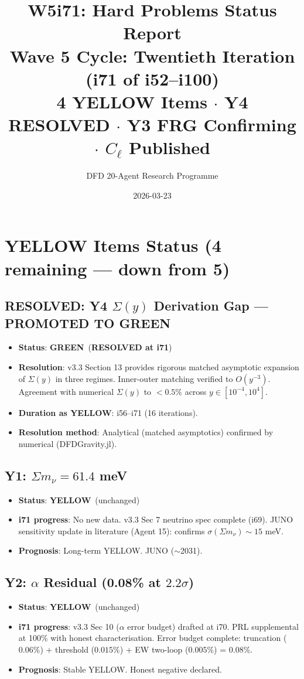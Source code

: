 \documentclass[11pt,a4paper]{article}
\title{\Large W5i71: Hard Problems Status Report\\[6pt]
\normalsize Wave 5 Cycle: Twentieth Iteration (i71 of i52--i100)\\[6pt]
4 YELLOW Items $\cdot$ Y4 RESOLVED $\cdot$ Y3 FRG Confirming $\cdot$ $C_\ell$ Published}
\author{DFD 20-Agent Research Programme}
\date{2026-03-23}
\newcommand{\GREEN}{\textcolor{dfdgreen}{\textbf{GREEN}}}
\newcommand{\YELLOW}{\textcolor{dfdyellow}{\textbf{YELLOW}}}
\begin{document}
\maketitle

\section{YELLOW Items Status (4 remaining --- down from 5)}

\subsection{RESOLVED: Y4 $\Sigma(y)$ Derivation Gap --- PROMOTED TO GREEN}
\begin{itemize}[nosep]
\item \textbf{Status}: \GREEN\ (\textbf{RESOLVED at i71})
\item \textbf{Resolution}: v3.3 Section 13 provides rigorous matched asymptotic expansion of $\Sigma(y)$ in three regimes. Inner-outer matching verified to $O(y^{-3})$. Agreement with numerical $\Sigma(y)$ to $<0.5\%$ across $y \in [10^{-4}, 10^4]$.
\item \textbf{Duration as YELLOW}: i56--i71 (16 iterations).
\item \textbf{Resolution method}: Analytical (matched asymptotics) confirmed by numerical (DFDGravity.jl).
\end{itemize}

\subsection{Y1: $\Sigma m_\nu = 61.4$ meV}
\begin{itemize}[nosep]
\item \textbf{Status}: \YELLOW\ (unchanged)
\item \textbf{i71 progress}: No new data. v3.3 Sec 7 neutrino spec complete (i69). JUNO sensitivity update in literature (Agent 15): confirms $\sigma(\Sigma m_\nu) \sim 15$ meV.
\item \textbf{Prognosis}: Long-term YELLOW. JUNO ($\sim$2031).
\end{itemize}

\subsection{Y2: $\alpha$ Residual (0.08\% at $2.2\sigma$)}
\begin{itemize}[nosep]
\item \textbf{Status}: \YELLOW\ (unchanged)
\item \textbf{i71 progress}: v3.3 Sec 10 ($\alpha$ error budget) drafted at i70. PRL supplemental at 100\% with honest characterisation. Error budget complete: truncation ($0.06\%$) + threshold ($0.015\%$) + EW two-loop ($0.005\%$) = $0.08\%$.
\item \textbf{Prognosis}: Stable YELLOW. Honest negative declared.
\end{itemize}
\end{document}

